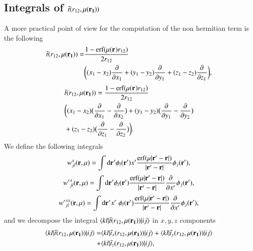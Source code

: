 \documentclass[aip,jcp,reprint,noshowkeys,superscriptaddress]{revtex4-1}
\newcommand{\matelem}[3]{\langle #1 | #2 | #3 \rangle}
\newcommand{\deriv}[3]{\frac{\partial^{#3} #1}{\partial {#2}^{#3}}}
\newcommand{\br}[0]{{\bf {r}}}
\newcommand{\dr}[1]{\text{d}{\bf r_{#1}}}
\newcommand{\mur}[1]{\mu({\bf r_{#1}})}
\begin{document}
\subsection{Integrals of $\tilde{t}(r_{12},\mur{1})$}
A more practical point of view for the computation of the non hermitian term is the following 
\begin{equation}
 \begin{aligned}
 \tilde{t}(r_{12},\mur{1}) =& \frac{1 - \text{erf}(\mur{} r_{12})}{2 r_{12}} \\ 
                           &\bigg( (x_1 - x_2) \deriv{}{x_1}{} + (y_1 - y_2) \deriv{}{y_1}{} + (z_1 - z_2) \deriv{}{z_1}{}\bigg),
 \end{aligned}
\end{equation}
\begin{equation}
 \begin{aligned}
 \label{def_non_hermit}
& \tilde{t}(r_{12},\mur{1})  = \frac{1 - \text{erf}(\mur{} r_{12})}{2 r_{12}} \\
& \bigg( (x_1 - x_2) \big( \deriv{}{x_1}{} - \deriv{}{x_2}{} \big) +
         (y_1 - y_2) \big( \deriv{}{y_1}{} - \deriv{}{y_2}{} \big)  \\
&  +      (z_1 - z_2) \big( \deriv{}{z_1}{} - \deriv{}{z_2}{} \big)\bigg).                                                
 \end{aligned}
\end{equation}
We define the following integrals
\begin{equation}
 {w}_{jl}^{x}(\br,\mu) = \int \dr{}' \phi_l(\br') x' \frac{\text{erf}(\mu |\br' - \br| )}{|\br' - \br|} \phi_j(\br'),
\end{equation}
\begin{equation}
 {w'}_{jl}^{x}(\br,\mu) = \int \dr{}' \phi_l(\br') \frac{\text{erf}(\mu |\br' - \br| )}{|\br' - \br|}\deriv{}{x'}{} \phi_j(\br'),
\end{equation}
\begin{equation}
 {w'}_{jl}^{xx}(\br,\mu) = \int \dr{}' x' \, \,\phi_l(\br') \frac{\text{erf}(\mu |\br' - \br| )}{|\br' - \br|}\deriv{}{x'}{} \phi_j(\br'),
\end{equation}
and we decompose the integral $\matelem{kl}{\tilde{t}(r_{12},\mur{1})}{ij}$ in $x,y,z$ components 
\begin{equation}
 \begin{aligned}
  \matelem{kl}{\tilde{t}(r_{12},\mur{1})}{ij} =& \matelem{kl}{\tilde{t}_x(r_{12},\mur{1})}{ij} 
                                              + \matelem{kl}{\tilde{t}_y(r_{12},\mur{1})}{ij} \\
                                              +& \matelem{kl}{\tilde{t}_z(r_{12},\mur{1})}{ij},
 \end{aligned}
\end{equation}
\end{document}

